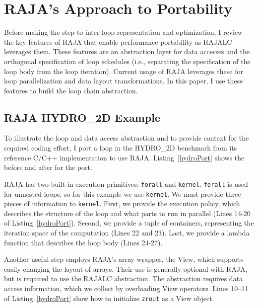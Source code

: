 \section{RAJA's Approach to Portability}

Before making the step to inter-loop representation and optimization, I review the key features of RAJA that enable performance portability
as RAJALC leverages them.
These features are an abstraction layer for data accesses and the
orthogonal specification of loop schedules
(i.e., separating the specification of the loop body from the loop iteration).
Current usage of RAJA leverages these for loop parallelization and
data layout transformations.
In this paper, I use these features to build the loop chain abstraction.

\subsection{RAJA HYDRO\_2D Example}
To illustrate the loop and data access abstraction and to provide context
for the required coding effort, I port a loop in the HYDRO\_2D benchmark
from its reference C/C++ implementation to use RAJA\@.
Listing~\ref{hydroPort} shows the before and after for the port.

RAJA has two built-in execution primitives: \verb.forall. and \verb.kernel..
\verb.forall. is used for unnested loops, so for this example we use
\verb.kernel..
We must provide three pieces of information to \verb.kernel.. 
First, we provide the execution policy, which describes the structure of
the loop and what parts to run in parallel (Lines 14-20 of Listing~\ref{hydroPort}).
Second, we provide a tuple of containers, representing the iteration space of the computation (Lines 22 and 23).
Last, we provide a lambda function that describes the loop body (Lines 24-27).

Another useful step employs RAJA's array wrapper, the View, which supports
easily changing the layout of arrays.
Their use is generally optional with RAJA, but is required to use the RAJALC abstraction.
The abstraction requires data access information, which we collect by
overloading View operators.
Lines 10--11 of Listing~\ref{hydroPort} show how to initialize \verb.zrout.
as a View object.

